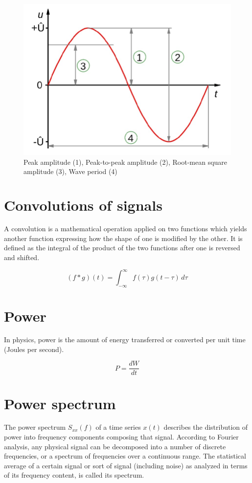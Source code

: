 \documentclass[journal,compsoc]{IEEEtran}
\begin{document}
\begin{figure}[H]
\begin{center}
\includegraphics[scale=0.2]{amplitude}
		\caption{Peak amplitude (1), Peak-to-peak amplitude (2), Root-mean square amplitude (3), Wave period (4)}
\end{center}
\end{figure}

\section{Convolutions of signals}

A convolution is a mathematical operation applied on two functions which yields another function expressing how the shape of one is modified by the other. It is defined as the integral of the product of the two functions after one is reversed and shifted.

\[ (f * g)(t) = \int_{-\infty}^{\infty} f(\tau)g(t-\tau) \,d\tau \]

\section{Power}
In physics, power is the amount of energy transferred or converted per unit time (Joules per second).

\[ P = \frac{dW}{dt} \]

\section{Power spectrum}
The power spectrum \( S_{xx}(f)\) of a time series \(x(t)\) describes the distribution of power into frequency components composing that signal. According to Fourier analysis, any physical signal can be decomposed into a number of discrete frequencies, or a spectrum of frequencies over a continuous range. The statistical average of a certain signal or sort of signal (including noise) as analyzed in terms of its frequency content, is called its spectrum.
\end{document}
